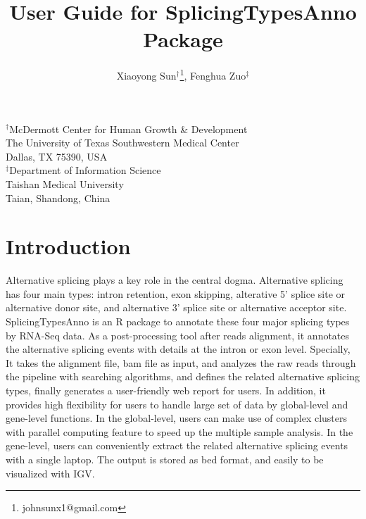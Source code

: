\documentclass[a4paper]{article}
\author{Xiaoyong Sun$^\dagger$\footnote{johnsunx1@gmail.com},
        Fenghua Zuo$^\ddagger$}
\begin{document}

\title{User Guide for SplicingTypesAnno Package}
\maketitle
\begin{center}
$^\dagger$McDermott Center for Human Growth \& Development \\ The University of Texas Southwestern Medical Center \\ Dallas, TX 75390, USA  \\
$^\ddagger$Department of Information Science \\ Taishan Medical University \\ Taian, Shandong, China
\end{center}

\tableofcontents

\section{Introduction}
Alternative splicing plays a key role in the central dogma. Alternative splicing has four main types: intron retention, exon skipping, alterative 5' splice site or alternative donor site, and alternative 3' splice site or alternative acceptor site. SplicingTypesAnno is an R package to annotate these four major splicing types by RNA-Seq data. As a post-processing tool after reads alignment, it annotates the alternative splicing events with details at the intron or exon level. Specially, It takes the alignment file, bam file as input, and analyzes the raw reads through the pipeline with searching algorithms, and defines the related alternative splicing types, finally generates a user-friendly web report for users. In addition, it provides high flexibility for users to handle large set of data by global-level and gene-level functions. In the global-level, users can make use of complex clusters with parallel computing feature to speed up the multiple sample analysis. In the gene-level, users can conveniently extract the related alternative splicing events with a single laptop. The output is stored as bed format, and easily to be visualized with IGV.
\end{document}

